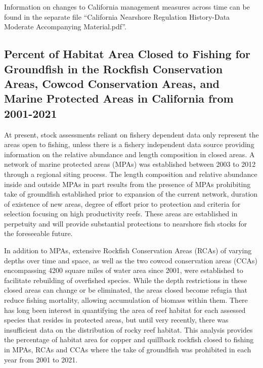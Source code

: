 \documentclass[11pt,
  english,
  a4paper,
]{article}
\begin{document}
Information on changes to California management measures across time can be found in the separate file ``California Nearshore Regulation History-Data Moderate Accompanying Material.pdf''.

\leavevmode\tagmcend\tagstructend\par


\hypertarget{ca-closed-open}{%
\subsection{Percent of Habitat Area Closed to Fishing for Groundfish in the Rockfish Conservation Areas, Cowcod Conservation Areas, and Marine Protected Areas in California from 2001-2021}\label{ca-closed-open}}

\leavevmode\tagmcend\tagstructend


At present, stock assessments reliant on fishery dependent data only represent the areas open to fishing, unless there is a fishery independent data source providing information on the relative abundance and length composition in closed areas. A network of marine protected areas (MPAs) was established between 2003 to 2012 through a regional siting process. The length composition and relative abundance inside and outside MPAs in part results from the presence of MPAs prohibiting take of groundfish established prior to expansion of the current network, duration of existence of new areas, degree of effort prior to protection and criteria for selection focusing on high productivity reefs. These areas are established in perpetuity and will provide substantial protections to nearshore fish stocks for the foreseeable future.

\leavevmode\tagmcend\tagstructend\par


In addition to MPAs, extensive Rockfish Conservation Areas (RCAs) of varying depths over time and space, as well as the two cowcod conservation areas (CCAs) encompassing 4200 square miles of water area since 2001, were established to facilitate rebuilding of overfished species. While the depth restrictions in these closed areas can change or be eliminated, the areas closed become refugia that reduce fishing mortality, allowing accumulation of biomass within them. There has long been interest in quantifying the area of reef habitat for each assessed species that resides in protected areas, but until very recently, there was insufficient data on the distribution of rocky reef habitat. This analysis provides the percentage of habitat area for copper and quillback rockfish closed to fishing in MPAs, RCAs and CCAs where the take of groundfish was prohibited in each year from 2001 to 2021.
\end{document}
